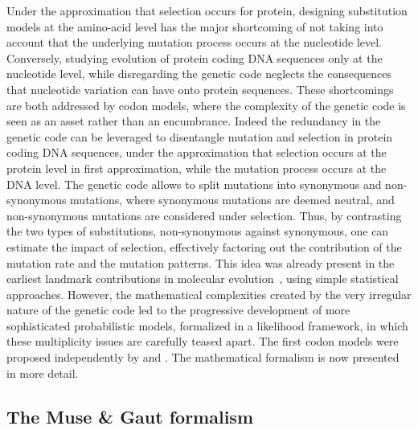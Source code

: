 Under the approximation that selection occurs for protein, designing \gls{substitution} models at the amino-acid level has the major shortcoming of not taking into account that the underlying mutation process occurs at the nucleotide level.
Conversely, studying evolution of protein coding \acrshort{DNA} sequences only at the nucleotide level, while disregarding the genetic code neglects the consequences that nucleotide variation can have onto protein sequences.
These shortcomings are both addressed by \gls{codon} models, where the complexity of the genetic code is seen as an asset rather than an encumbrance.
Indeed the redundancy in the genetic code can be leveraged to disentangle mutation and selection in protein coding \acrshort{DNA} sequences, under the approximation that selection occurs at the protein level in first approximation, while the mutation process occurs at the \acrshort{DNA} level.
The genetic code allows to split mutations into synonymous and non-synonymous mutations, where synonymous mutations are deemed \gls{neutral}, and non-synonymous mutations are considered under selection.
Thus, by contrasting the two types of substitutions, non-synonymous against synonymous, one can estimate the impact of selection, effectively factoring out the contribution of the mutation rate and the mutation patterns.
This idea was already present in the earliest landmark contributions in molecular evolution~\citep{Kimura1968,King1969}, using simple statistical approaches.
However, the mathematical complexities created by the very irregular nature of the genetic code led to the progressive development of more sophisticated probabilistic models, formalized in a likelihood framework, in which these multiplicity issues are carefully teased apart.
The first codon models were proposed independently by \citet{Muse1994} and \citet{Goldman1994}.
The mathematical formalism is now presented in more detail.

\subsection{The Muse \& Gaut formalism}
\label{subsec:MG-formalism}

